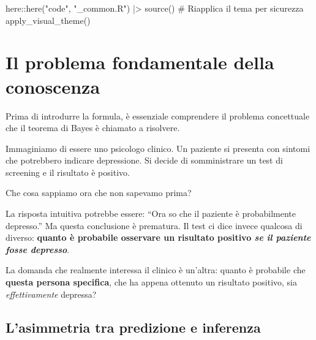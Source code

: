 \documentclass[
  italian,
  letterpaper,
  a4paper,
  11pt,
  open=any]{scrbook}
\newenvironment{Shaded}{\begin{snugshade}}{\end{snugshade}}
\newcommand{\CommentTok}[1]{\textcolor[rgb]{0.37,0.37,0.37}{#1}}
\newcommand{\FunctionTok}[1]{\textcolor[rgb]{0.28,0.35,0.67}{#1}}
\newcommand{\NormalTok}[1]{\textcolor[rgb]{0.00,0.23,0.31}{#1}}
\newcommand{\SpecialCharTok}[1]{\textcolor[rgb]{0.37,0.37,0.37}{#1}}
\newcommand{\StringTok}[1]{\textcolor[rgb]{0.13,0.47,0.30}{#1}}
\theoremstyle{plain}
\theoremstyle{definition}
\theoremstyle{definition}
\theoremstyle{remark}
\begin{document}
\begin{tcolorbox}[enhanced jigsaw, arc=.35mm, bottomrule=.15mm, bottomtitle=1mm, breakable, colback=white, colbacktitle=quarto-callout-caution-color!10!white, colframe=quarto-callout-caution-color-frame, coltitle=black, left=2mm, leftrule=.75mm, opacityback=0, opacitybacktitle=0.6, rightrule=.15mm, title=\textcolor{quarto-callout-caution-color}{\faFire}\hspace{0.5em}{Preparazione del Notebook}, titlerule=0mm, toprule=.15mm, toptitle=1mm]

\begin{Shaded}
\begin{Highlighting}[]
\NormalTok{here}\SpecialCharTok{::}\FunctionTok{here}\NormalTok{(}\StringTok{"code"}\NormalTok{, }\StringTok{"\_common.R"}\NormalTok{) }\SpecialCharTok{|\textgreater{}} 
  \FunctionTok{source}\NormalTok{()}
\CommentTok{\# Riapplica il tema per sicurezza}
\FunctionTok{apply\_visual\_theme}\NormalTok{()}
\end{Highlighting}
\end{Shaded}

\end{tcolorbox}

\section{Il problema fondamentale della
conoscenza}\label{sec-inverse-problem}

Prima di introdurre la formula, è essenziale comprendere il problema
concettuale che il teorema di Bayes è chiamato a risolvere.

Immaginiamo di essere uno psicologo clinico. Un paziente si presenta con
sintomi che potrebbero indicare depressione. Si decide di somministrare
un test di screening e il risultato è positivo.

Che cosa sappiamo ora che non sapevamo prima?

La risposta intuitiva potrebbe essere: ``Ora so che il paziente è
probabilmente depresso.'' Ma questa conclusione è prematura. Il test ci
dice invece qualcosa di diverso: \textbf{quanto è probabile osservare un
risultato positivo \emph{se il paziente fosse depresso}}.

La domanda che realmente interessa il clinico è un'altra: quanto è
probabile che \textbf{questa persona specifica}, che ha appena ottenuto
un risultato positivo, sia \emph{effettivamente} depressa?

\subsection{L'asimmetria tra predizione e
inferenza}\label{lasimmetria-tra-predizione-e-inferenza}
\end{document}

